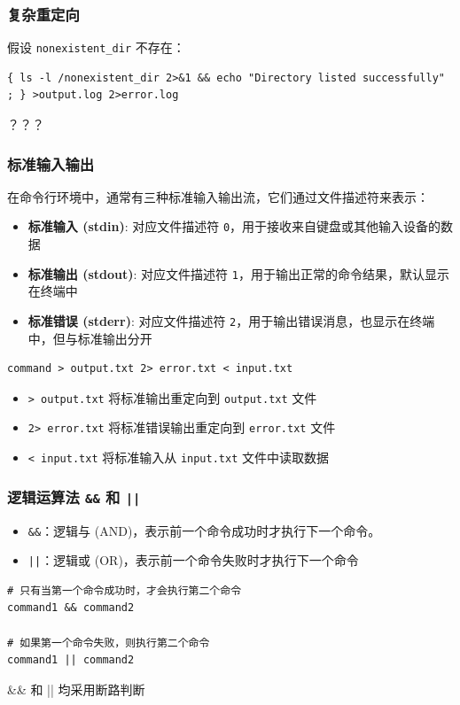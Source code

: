 \documentclass[UTF8, 16pt]{beamer}
\begin{document}
\begin{frame}[fragile]
    \frametitle{复杂重定向}
    \textcolor{sufered}{假设 \texttt{nonexistent\_dir} 不存在：}
    
    \begin{lstlisting}[numbers=none]
{ ls -l /nonexistent_dir 2>&1 && echo "Directory listed successfully" ; } >output.log 2>error.log\end{lstlisting}
    
    ？？？
\end{frame}

\begin{frame}[fragile]
    \frametitle{标准输入输出}
    
    在命令行环境中，通常有三种标准输入输出流，它们通过文件描述符来表示：
    
    \begin{itemize}
        \item \textbf{标准输入 (stdin)}: 对应文件描述符 \texttt{0}，用于接收来自键盘或其他输入设备的数据
        \item \textbf{标准输出 (stdout)}: 对应文件描述符 \texttt{1}，用于输出正常的命令结果，默认显示在终端中
        \item \textbf{标准错误 (stderr)}: 对应文件描述符 \texttt{2}，用于输出错误消息，也显示在终端中，但与标准输出分开
    \end{itemize}
    
    \begin{lstlisting}[numbers=none]
command > output.txt 2> error.txt < input.txt\end{lstlisting}
    \begin{itemize}
        \item \texttt{> output.txt} 将标准输出重定向到 \texttt{output.txt} 文件
        \item \texttt{2> error.txt} 将标准错误输出重定向到 \texttt{error.txt} 文件
        \item \texttt{< input.txt} 将标准输入从 \texttt{input.txt} 文件中读取数据
    \end{itemize}
\end{frame}

\begin{frame}[fragile]
    \frametitle{逻辑运算法 \texttt{\&\&} 和 \texttt{||}}
    
    \begin{itemize}
        \item \texttt{\&\&}：逻辑与 (AND)，表示前一个命令成功时才执行下一个命令。
        \item \texttt{||}：逻辑或 (OR)，表示前一个命令失败时才执行下一个命令
    \end{itemize}
    
    \begin{lstlisting}
# 只有当第一个命令成功时，才会执行第二个命令
command1 && command2

# 如果第一个命令失败，则执行第二个命令
command1 || command2\end{lstlisting}
    \&\& 和 || 均采用断路判断
\end{frame}
\end{document}
